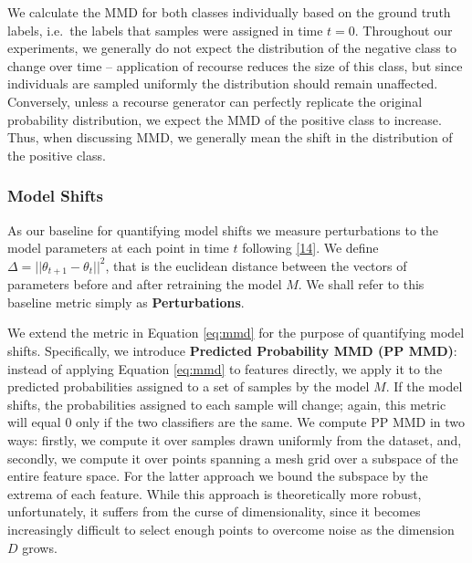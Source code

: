 \documentclass[conference,final,]{IEEEtran}
\theoremstyle{definition}
\theoremstyle{definition}
\theoremstyle{definition}
\theoremstyle{definition}
\theoremstyle{remark}
\begin{document}
We calculate the MMD for both classes individually based on the ground truth labels, i.e.~the labels that samples were assigned in time \(t=0\). Throughout our experiments, we generally do not expect the distribution of the negative class to change over time -- application of recourse reduces the size of this class, but since individuals are sampled uniformly the distribution should remain unaffected. Conversely, unless a recourse generator can perfectly replicate the original probability distribution, we expect the MMD of the positive class to increase. Thus, when discussing MMD, we generally mean the shift in the distribution of the positive class.

\hypertarget{model-shifts}{%
\subsubsection{Model Shifts}\label{model-shifts}}

As our baseline for quantifying model shifts we measure perturbations to the model parameters at each point in time \(t\) following \protect\hyperlink{ref-upadhyay2021towards}{{[}14{]}}. We define \(\Delta=||\theta_{t+1}-\theta_{t}||^2\), that is the euclidean distance between the vectors of parameters before and after retraining the model \(M\). We shall refer to this baseline metric simply as \textbf{Perturbations}.

We extend the metric in Equation \eqref{eq:mmd} for the purpose of quantifying model shifts. Specifically, we introduce \textbf{Predicted Probability MMD (PP MMD)}: instead of applying Equation \eqref{eq:mmd} to features directly, we apply it to the predicted probabilities assigned to a set of samples by the model \(M\). If the model shifts, the probabilities assigned to each sample will change; again, this metric will equal 0 only if the two classifiers are the same. We compute PP MMD in two ways: firstly, we compute it over samples drawn uniformly from the dataset, and, secondly, we compute it over points spanning a mesh grid over a subspace of the entire feature space. For the latter approach we bound the subspace by the extrema of each feature. While this approach is theoretically more robust, unfortunately, it suffers from the curse of dimensionality, since it becomes increasingly difficult to select enough points to overcome noise as the dimension \(D\) grows.
\end{document}
